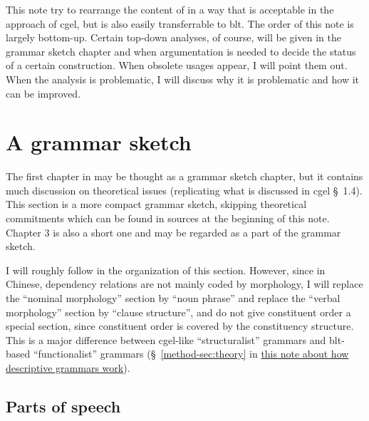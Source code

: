 \documentclass[UTF8, a4paper, oneside, scheme=plain]{ctexart}
\newcommand*{\citesec}[1]{\S~{#1}}
\newcommand{\method}{\href{../methodology/glossing.pdf}{this note about how descriptive grammars work}}
\begin{document}
This note try to rearrange the content of \citet{zhudexigrammar}
in a way that is acceptable in the approach of \ac{cgel},
but is also easily transferrable to \ac{blt}.
The order of this note is largely bottom-up.
Certain top-down analyses, of course, will be given in the grammar sketch chapter
and when argumentation is needed to decide the status of a certain construction.
When obsolete usages appear, I will point them out.
When the analysis is problematic, I will discuss why it is problematic and how it can be improved.

\section{A grammar sketch}

The first chapter in \citet{zhudexigrammar} may be thought as a grammar sketch chapter,
but it contains much discussion on theoretical issues
(replicating what is discussed in \ac{cgel} \citesec{1.4}).
This section is a more compact grammar sketch,
skipping theoretical commitments which can be found in sources at the beginning of this note.
Chapter 3 is also a short one and may be regarded as a part of the grammar sketch.

I will roughly follow \citet{jacques2021grammar} in the organization of this section.
However, since in Chinese, dependency relations are not mainly coded by morphology,
I will replace the ``nominal morphology'' section by ``noun phrase''
and replace the ``verbal morphology'' section by ``clause structure'',
and do not give constituent order a special section,
since constituent order is covered by the constituency structure.
This is a major difference between \ac{cgel}-like ``structuralist'' grammars 
and \ac{blt}-based ``functionalist'' grammars
(\citesec{\ref{method-sec:theory}} in \method).

\subsection{Parts of speech}
\end{document}
